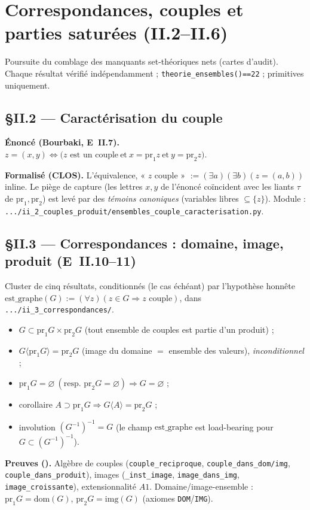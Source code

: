 \section{Correspondances, couples et parties saturées (II.2--II.6)}

Poursuite du comblage des manquants set-théoriques nets (cartes d'audit). Chaque
résultat vérifié indépendamment ; \texttt{theorie\_ensembles()==22} ; primitives
\Nstar{} uniquement.

\subsection{§II.2 --- Caractérisation du couple}
\textbf{Énoncé (Bourbaki, E~II.7).} $z=(x,y)\Leftrightarrow\bigl(z\text{ est un couple}
\ \text{et}\ x=\mathrm{pr}_1 z\ \text{et}\ y=\mathrm{pr}_2 z\bigr)$.

\textbf{Formalisé (CLOS).} L'équivalence, « $z$ couple » $:=(\exists a)(\exists b)(z=(a,b))$
inline. Le piège de capture (les lettres $x,y$ de l'énoncé coïncident avec les liants
$\tau$ de $\mathrm{pr}_1,\mathrm{pr}_2$) est levé par des \emph{témoins canoniques}
(variables libres $\subseteq\{z\}$). Module : \texttt{.../ii\_2\_couples\_produit/ensembles\_couple\_caracterisation.py}.

\subsection{§II.3 --- Correspondances : domaine, image, produit (E~II.10--11)}
Cluster de cinq résultats, conditionnés (le cas échéant) par l'hypothèse honnête
$\mathrm{est\_graphe}(G):=(\forall z)(z\in G\Rightarrow z\text{ couple})$, dans
\texttt{.../ii\_3\_correspondances/}.
\begin{itemize}
  \item $G\subset \mathrm{pr}_1G\times\mathrm{pr}_2G$ (tout ensemble de couples est partie d'un produit) ;
  \item $G\langle\mathrm{pr}_1G\rangle=\mathrm{pr}_2G$ (image du domaine $=$ ensemble des valeurs), \emph{inconditionnel} ;
  \item $\mathrm{pr}_1G=\varnothing\ (\text{resp. }\mathrm{pr}_2G=\varnothing)\Rightarrow G=\varnothing$ ;
  \item corollaire $A\supset\mathrm{pr}_1G\Rightarrow G\langle A\rangle=\mathrm{pr}_2G$ ;
  \item involution $(G^{-1})^{-1}=G$ (le champ $\mathrm{est\_graphe}$ est load-bearing
        pour $G\subset(G^{-1})^{-1}$).
\end{itemize}
\textbf{Preuves (\Nstar).} Algèbre de couples (\texttt{couple\_reciproque},
\texttt{couple\_dans\_dom/img}, \texttt{couple\_dans\_produit}), images
(\texttt{\_inst\_image}, \texttt{image\_dans\_img}, \texttt{image\_croissante}),
extensionnalité $A1$. Domaine/image-ensemble : $\mathrm{pr}_1G=\mathrm{dom}(G)$,
$\mathrm{pr}_2G=\mathrm{img}(G)$ (axiomes \texttt{DOM}/\texttt{IMG}).

